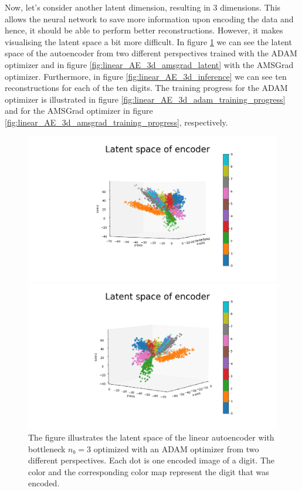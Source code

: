 Now, let's consider another latent dimension, resulting in $3$ dimensions. This allows the neural network to save more information upon encoding the data and hence, it should be able to perform better reconstructions. However, it makes visualising the latent space a bit more difficult. In figure \ref{fig:linear_AE_3d_adam_latent} we can see the latent space of the autoencoder from two different perspectives trained with the ADAM optimizer and in figure \ref{fig:linear_AE_3d_amsgrad_latent} with the AMSGrad optimizer. Furthermore, in figure \ref{fig:linear_AE_3d_inference} we can see ten reconstructions for each of the ten digits. The training progress for the ADAM optimizer is illustrated in figure \ref{fig:linear_AE_3d_adam_training_progress} and for the AMSGrad optimizer in figure \ref{fig:linear_AE_3d_amsgrad_training_progress}, respectively.


\begin{figure}
\begin{center}
   \begin{minipage}[b]{0.49\linewidth}
      \includegraphics[width=\linewidth]{linear_AE_3d_adam_latent_1}
	\end{minipage}
	\begin{minipage}[b]{0.49\linewidth}
      \includegraphics[width=\linewidth]{linear_AE_3d_adam_latent_2}
	\end{minipage}
\end{center}
\caption{The figure illustrates the latent space of the linear autoencoder with bottleneck $n_b=3$ optimized with an ADAM optimizer from two different perspectives. Each dot is one encoded image of a digit. The color and the corresponding color map represent the digit that was encoded.}\label{fig:linear_AE_3d_adam_latent}
\end{figure}

